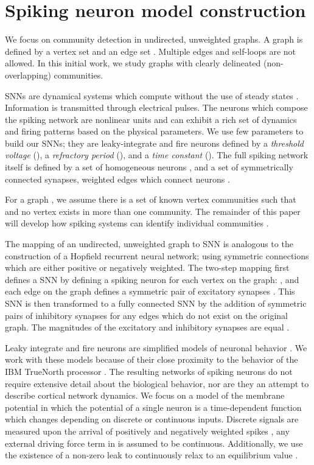 \documentclass[sigconf]{acmart}
\begin{document}
\section{Spiking neuron model construction}
\label{sec:SNN_construction}
We focus on community detection in undirected, unweighted graphs. A graph is defined by a vertex set and an edge set . Multiple edges and self-loops are not allowed. In this initial work, we study graphs with clearly delineated (non-overlapping) communities. 

SNNs are dynamical systems which compute without the use of steady states \cite{maass1997networks,maass2001pulsed}. Information is transmitted through electrical pulses. The neurons which compose the spiking network are nonlinear units and can exhibit a rich set of dynamics and firing patterns based on the physical parameters. We use few parameters to build our SNNs; they are leaky-integrate and fire neurons defined by a \textit{threshold voltage} (), a \textit{refractory period} (), and a \textit{time constant} (). The full spiking network itself  is defined by a set of homogeneous neurons , and a set of symmetrically connected synapses, weighted edges which connect neurons . 

For a graph , we assume there is a set of known vertex communities  such that  and no vertex exists in more than one community.  The remainder of this paper will develop how spiking systems can identify individual communities .

The mapping of an undirected, unweighted graph to SNN is analogous to the construction of a Hopfield recurrent neural network; using symmetric connections which are either positive or negatively weighted. The two-step mapping first defines a SNN by defining a spiking neuron for each vertex on the graph: , and each edge on the graph defines a symmetric pair of excitatory synapses . This SNN is then transformed to a fully connected SNN by the addition of symmetric pairs of inhibitory synapses  for any edges which do not exist on the original graph. The magnitudes of the excitatory and inhibitory synapses are equal .

Leaky integrate and fire neurons are simplified models of neuronal behavior \cite{gerstner2002spiking}. We work with these models because of their close proximity to the behavior of the IBM TrueNorth processor \cite{merolla2014million,cassidy2013cognitive}. The resulting networks of spiking neurons do not require extensive detail about the biological behavior, nor are they an attempt to describe cortical network dynamics. We focus on a model of the membrane potential in which the potential  of a single neuron is a time-dependent function which changes depending on discrete or continuous inputs. Discrete signals are measured upon the arrival of positively and negatively weighted spikes , any external driving force term in  is assumed to be continuous. Additionally, we use the existence of a non-zero leak  to continuously relax  to an equilibrium value .
\end{document}
